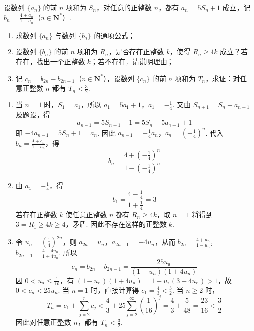 \begin{problem}
设数列 \(\{a_n\}\) 的前 \(n\) 项和为 \(S_n\)，对任意的正整数 \(n\)，都有 \(a_n = 5S_n + 1\) 成立，记 \(b_n = \frac{4 + a_n}{1 - a_n}\)（\(n \in \mathbf{N}^{*}\)）.

\begin{enumerate}
\item 求数列 \(\{a_n\}\) 与数列 \(\{b_n\}\) 的通项公式；
\item 设数列 \(\{b_n\}\) 的前 \(n\) 项和为 \(R_n\)，是否存在正整数 \(k\)，使得 \(R_n \geqslant 4k\) 成立？若存在，找出一个正整数 \(k\)；若不存在，请说明理由；
\item 记 \(c_n = b_{2n} - b_{2n-1}\)（\(n \in \mathbf{N}^{*}\)），设数列 \(\{c_n\}\) 的前 \(n\) 项和为 \(T_n\)，求证：对任意正整数 \(n\) 都有 \(T_n < \frac{3}{2}\).
\end{enumerate}
\begin{solution}
\begin{enumerate}
\item 当 \(n=1\) 时，\(S_1=a_1\)，所以
\(a_1=5a_1+1\)，\(a_1=-\frac14\).
又由 \(S_{n+1}=S_n+a_{n+1}\) 及题设，得
\[
a_{n+1}=5S_{n+1}+1=5S_n+5a_{n+1}+1
\]
即 \(-4a_{n+1}=5S_n+1=a_n\). 因此
\(a_{n+1}=-\frac14a_n\)，\(a_n=\left(-\frac14\right)^n\).
代入 \(b_n=\frac{4+a_n}{1-a_n}\)，得
\[
b_n=\frac{4+\left(-\frac14\right)^n}{1-\left(-\frac14\right)^n}
\]

\item 由 \(a_1=-\frac14\)，得
\[
b_1=\frac{4-\frac14}{1+\frac14}=3
\]
若存在正整数 \(k\) 使任意正整数 \(n\) 都有 \(R_n\ge4k\)，取 \(n=1\) 将得到
\(3=R_1\ge4k\ge4\)，矛盾. 因此不存在这样的正整数 \(k\).

\item 令 \(u_n=\left(\frac14\right)^{2n}\)，则
\(a_{2n}=u_n\)，\(a_{2n-1}=-4u_n\)，从而
\(b_{2n}=\frac{4+u_n}{1-u_n}\)，\(b_{2n-1}=\frac{4-4u_n}{1+4u_n}\).
所以
\[
c_n=b_{2n}-b_{2n-1}
=\frac{25u_n}{(1-u_n)(1+4u_n)}
\]
因 \(0<u_n\le\frac1{16}\)，有
\((1-u_n)(1+4u_n)=1+u_n(3-4u_n)>1\)，故
\(0<c_n<25u_n\). 当 \(n=1\) 时，直接计算得
\(c_1=\frac43<\frac32\). 当 \(n\ge2\) 时，
\[
T_n=c_1+\sum_{j=2}^{n}c_j
<\frac43+25\sum_{j=2}^{\infty}\left(\frac1{16}\right)^j
=\frac43+\frac5{48}=\frac{23}{16}<\frac32
\]
因此对任意正整数 \(n\)，都有 \(T_n<\frac32\).
\end{enumerate}
\end{solution}
\end{problem}
